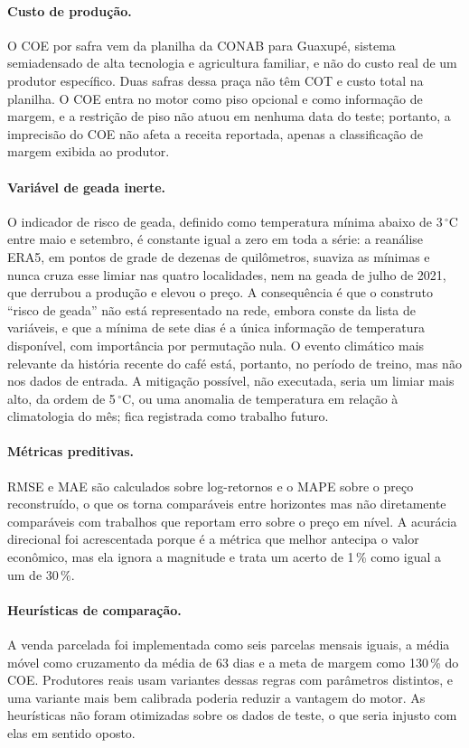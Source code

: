 \paragraph{Custo de produção.} O COE por safra vem da planilha da CONAB para Guaxupé, sistema semiadensado de alta tecnologia e agricultura familiar, e não do custo real de um produtor específico. Duas safras dessa praça não têm COT e custo total na planilha. O COE entra no motor como piso opcional e como informação de margem, e a restrição de piso não atuou em nenhuma data do teste; portanto, a imprecisão do COE não afeta a receita reportada, apenas a classificação de margem exibida ao produtor.

\paragraph{Variável de geada inerte.} O indicador de risco de geada, definido como temperatura mínima abaixo de 3\,$^{\circ}$C entre maio e setembro, é constante igual a zero em toda a série: a reanálise ERA5, em pontos de grade de dezenas de quilômetros, suaviza as mínimas e nunca cruza esse limiar nas quatro localidades, nem na geada de julho de 2021, que derrubou a produção e elevou o preço. A consequência é que o construto ``risco de geada'' não está representado na rede, embora conste da lista de variáveis, e que a mínima de sete dias é a única informação de temperatura disponível, com importância por permutação nula. O evento climático mais relevante da história recente do café está, portanto, no período de treino, mas não nos dados de entrada. A mitigação possível, não executada, seria um limiar mais alto, da ordem de 5\,$^{\circ}$C, ou uma anomalia de temperatura em relação à climatologia do mês; fica registrada como trabalho futuro.

\paragraph{Métricas preditivas.} RMSE e MAE são calculados sobre log-retornos e o MAPE sobre o preço reconstruído, o que os torna comparáveis entre horizontes mas não diretamente comparáveis com trabalhos que reportam erro sobre o preço em nível. A acurácia direcional foi acrescentada porque é a métrica que melhor antecipa o valor econômico, mas ela ignora a magnitude e trata um acerto de 1\,\% como igual a um de 30\,\%.

\paragraph{Heurísticas de comparação.} A venda parcelada foi implementada como seis parcelas mensais iguais, a média móvel como cruzamento da média de 63 dias e a meta de margem como 130\,\% do COE. Produtores reais usam variantes dessas regras com parâmetros distintos, e uma variante mais bem calibrada poderia reduzir a vantagem do motor. As heurísticas não foram otimizadas sobre os dados de teste, o que seria injusto com elas em sentido oposto.

